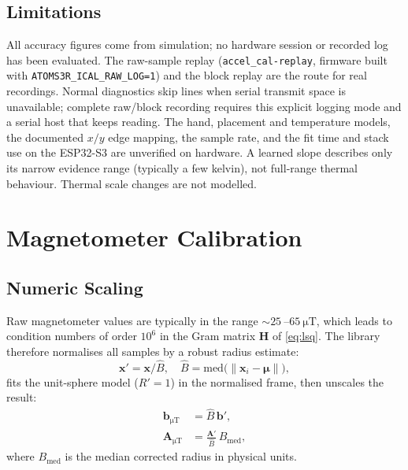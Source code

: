 \documentclass[conference]{IEEEtran}
\begin{document}
    \subsection{Limitations}

    All accuracy figures come from simulation; no hardware session or
    recorded log has been evaluated. The raw-sample replay
    (\texttt{accel\_cal-replay}, firmware built with
    \texttt{ATOMS3R\_ICAL\_RAW\_LOG=1}) and the block replay are the route
    for real recordings. Normal diagnostics skip lines when serial transmit
    space is unavailable; complete raw/block recording requires this explicit
    logging mode and a serial host that keeps reading. The hand, placement and temperature models, the
    documented $x/y$ edge mapping, the sample rate, and the fit time and
    stack use on the ESP32-S3 are unverified on hardware. A learned slope
    describes only its narrow evidence range (typically a few kelvin), not
    full-range thermal behaviour. Thermal scale changes are not modelled.

    \section{Magnetometer Calibration}
    \label{sec:mag_fit}

    \subsection{Numeric Scaling}

    Raw magnetometer values are typically in the range
    $\sim\SI{25}{}$--$\SI{65}{\micro\tesla}$, which leads to condition
    numbers of order $10^6$ in the Gram matrix $\mathbf{H}$
    of \eqref{eq:lsq}.
    The library therefore normalises all samples by a robust radius estimate:
    \begin{equation}
        \mathbf{x}' = \mathbf{x} / \hat{B},
        \quad
        \hat{B} = \mathrm{med}\bigl(\|\mathbf{x}_i - \boldsymbol{\mu}\|\bigr),
    \end{equation}
    fits the unit-sphere model ($R'=1$) in the normalised frame, then
    unscales the result:
    \begin{align}
        \mathbf{b}_{\si{\micro\tesla}} &= \hat{B}\,\mathbf{b}', \\
        \mathbf{A}_{\si{\micro\tesla}} &= \frac{\mathbf{A}'}{{\hat{B}}}\,B_\text{med},
    \end{align}
    where $B_\text{med}$ is the median corrected radius in physical units.
\end{document}
